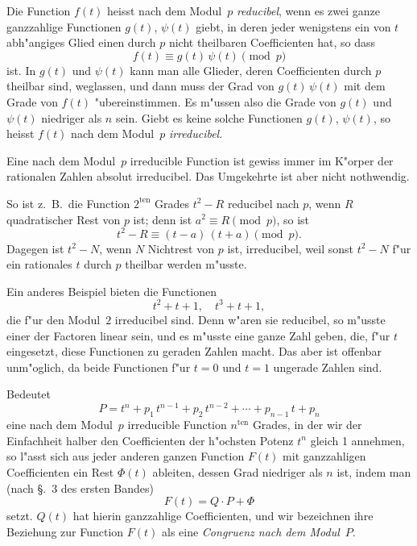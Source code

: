 \documentclass[12pt,a4paper]{article}
\theoremstyle{plain}
\theoremstyle{definition}
\theoremstyle{remark}
\begin{document}
Die Function $f(t)$ heisst nach dem Modul~$p$ \emph{reducibel}, wenn es zwei ganze ganzzahlige Functionen $g(t)$, $\psi(t)$ giebt, in deren jeder wenigstens ein von $t$ abh"angiges Glied einen durch $p$ nicht theilbaren Coefficienten hat, so dass
\begin{equation}\tag{2}
f(t) \equiv g(t)\,\psi(t) \pmod{p}
\end{equation}
ist. In $g(t)$ und $\psi(t)$ kann man alle Glieder, deren Coefficienten durch $p$ theilbar sind, weglassen, und dann muss der Grad von $g(t)\,\psi(t)$ mit dem Grade von $f(t)$ "ubereinstimmen. Es m"ussen also die Grade von $g(t)$ und $\psi(t)$ niedriger als $n$ sein. Giebt es keine solche Functionen $g(t)$, $\psi(t)$, so heisst $f(t)$ nach dem Modul~$p$ \emph{irreducibel}.

Eine nach dem Modul~$p$ irreducible Function ist gewiss immer im K"orper der rationalen Zahlen absolut irreducibel. Das Umgekehrte ist aber nicht nothwendig.

So ist z.~B.\ die Function $2^{\text{ten}}$ Grades $t^{2} - R$ reducibel nach $p$, wenn $R$ quadratischer Rest von $p$ ist; denn ist $a^{2} \equiv R \pmod{p}$, so ist
\[
t^{2} - R \equiv (t - a)\,(t + a) \pmod{p}.
\]
Dagegen ist $t^{2} - N$, wenn $N$ Nichtrest von $p$ ist, irreducibel, weil sonst $t^{2} - N$ f"ur ein rationales $t$ durch $p$ theilbar werden m"usste.

Ein anderes Beispiel bieten die Functionen
\[
t^{2} + t + 1,\quad t^{3} + t + 1,
\]
die f"ur den Modul~$2$ irreducibel sind. Denn w"aren sie reducibel, so m"usste einer der Factoren linear sein, und es m"usste eine ganze Zahl geben, die, f"ur $t$ eingesetzt, diese Functionen zu geraden Zahlen macht. Das aber ist offenbar unm"oglich, da beide Functionen f"ur $t = 0$ und $t = 1$ ungerade Zahlen sind.

Bedeutet
\begin{equation}\tag{3}
P = t^{n} + p_{1}\,t^{n-1} + p_{2}\,t^{n-2} + \cdots + p_{n-1}\,t + p_{n}
\end{equation}
eine nach dem Modul~$p$ irreducible Function $n^{\text{ten}}$ Grades, in der wir der Einfachheit halber den Coefficienten der h"ochsten Potenz $t^{n}$ gleich 1 annehmen, so l"asst sich aus jeder anderen ganzen Function $F(t)$ mit ganzzahligen Coefficienten ein Rest $\Phi(t)$ ableiten, dessen Grad niedriger als $n$ ist, indem man (nach \S.~3 des ersten Bandes)
\begin{equation}\tag{4}
F(t) = Q \cdot P + \Phi
\end{equation}
setzt. $Q(t)$ hat hierin ganzzahlige Coefficienten, und wir bezeichnen ihre Beziehung zur Function $F(t)$ als eine \emph{Congruenz nach dem Modul}~$P$.
\end{document}
